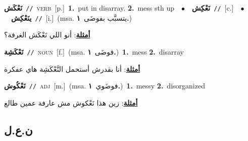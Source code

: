\documentclass[10pt,a4paper,twoside]{article} %
\begin{document}
\begin{multicols}{2}
{\setlength\topsep{0pt}\textbf{\foreignlanguage{arabic}{نَعْكَش}}\ {\color{gray}\texttt{//}\color{black}}\ \textsc{verb}\ [p.]\ \textbf{1.}~put in disarray.  \textbf{2.}~mess sth up\ \ $\bullet$\ \ \setlength\topsep{0pt}\textbf{\foreignlanguage{arabic}{نَعْكِش}}\ {\color{gray}\texttt{//}\color{black}}\ [c.]\ \ $\bullet$\ \ \setlength\topsep{0pt}\textbf{\foreignlanguage{arabic}{ينَعْكِش}}\ {\color{gray}\texttt{//}\color{black}}\ [i.]\ \color{gray}(msa. \foreignlanguage{arabic}{يتسبَّب بفوضَى}~\foreignlanguage{arabic}{\textbf{١.}})\color{black}\  \begin{flushright}\color{gray}\foreignlanguage{arabic}{\textbf{\underline{\foreignlanguage{arabic}{أمثلة}}}: أنو اللي نَعْكَش الغرفة؟}\end{flushright}\color{black}} \vspace{2mm}

{\setlength\topsep{0pt}\textbf{\foreignlanguage{arabic}{نَعْكَشِة}}\ {\color{gray}\texttt{//}\color{black}}\ \textsc{noun}\ [f.]\ \color{gray}(msa. \foreignlanguage{arabic}{فوضَى}~\foreignlanguage{arabic}{\textbf{١.}})\color{black}\ \textbf{1.}~mess  \textbf{2.}~disarray\  \begin{flushright}\color{gray}\foreignlanguage{arabic}{\textbf{\underline{\foreignlanguage{arabic}{أمثلة}}}: أنا بقدرش أستحمل النَّعْكَشِة هاي عفكرة}\end{flushright}\color{black}} \vspace{2mm}

{\setlength\topsep{0pt}\textbf{\foreignlanguage{arabic}{نَعْكُوش}}\ {\color{gray}\texttt{//}\color{black}}\ \textsc{adj}\ [m.]\ \color{gray}(msa. \foreignlanguage{arabic}{فوضَوي}~\foreignlanguage{arabic}{\textbf{١.}})\color{black}\ \textbf{1.}~messy  \textbf{2.}~disorganized\  \begin{flushright}\color{gray}\foreignlanguage{arabic}{\textbf{\underline{\foreignlanguage{arabic}{أمثلة}}}: زين هذا نَعْكوش مش عارفة عمين طالع}\end{flushright}\color{black}} \vspace{2mm}

\vspace{-3mm}
\subsection*{\color{blue}\foreignlanguage{arabic}{ن.ع.ل}\color{blue}{}} 


\end{multicols}
\end{document}
